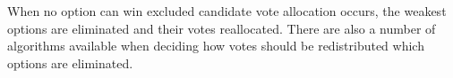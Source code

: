 When no option can win excluded candidate vote allocation occurs, the weakest
options are eliminated and their votes reallocated. There are also a number of
algorithms available when deciding how votes should be redistributed which
options are eliminated.\cite{electoral-handbook}


%



